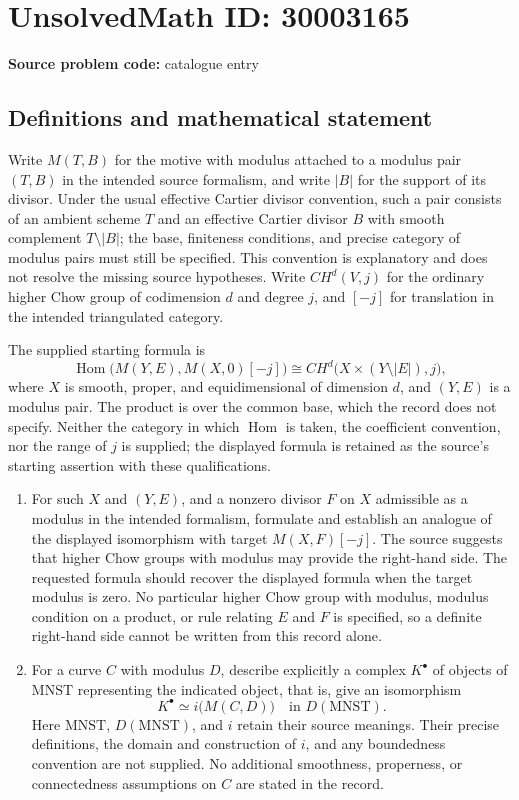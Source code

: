 \documentclass[11pt]{article}
\begin{document}
\section*{UnsolvedMath ID: 30003165}
\textbf{Source problem code:} catalogue entry
\subsection{Definitions and mathematical statement}
Write \(M(T,B)\) for the motive with modulus attached to a modulus pair \((T,B)\) in the intended source formalism, and write \(|B|\) for the support of its divisor. Under the usual effective Cartier divisor convention, such a pair consists of an ambient scheme \(T\) and an effective Cartier divisor \(B\) with smooth complement \(T\setminus |B|\); the base, finiteness conditions, and precise category of modulus pairs must still be specified. This convention is explanatory and does not resolve the missing source hypotheses. Write \(CH^d(V,j)\) for the ordinary higher Chow group of codimension \(d\) and degree \(j\), and \([-j]\) for translation in the intended triangulated category.

The supplied starting formula is
\[
\operatorname{Hom}\bigl(M(Y,E),M(X,0)[-j]\bigr)
\cong CH^d\bigl(X\times(Y\setminus |E|),j\bigr),
\]
where \(X\) is smooth, proper, and equidimensional of dimension \(d\), and \((Y,E)\) is a modulus pair. The product is over the common base, which the record does not specify. Neither the category in which \(\operatorname{Hom}\) is taken, the coefficient convention, nor the range of \(j\) is supplied; the displayed formula is retained as the source's starting assertion with these qualifications.

\begin{enumerate}
\item For such \(X\) and \((Y,E)\), and a nonzero divisor \(F\) on \(X\) admissible as a modulus in the intended formalism, formulate and establish an analogue of the displayed isomorphism with target \(M(X,F)[-j]\). The source suggests that higher Chow groups with modulus may provide the right-hand side. The requested formula should recover the displayed formula when the target modulus is zero. No particular higher Chow group with modulus, modulus condition on a product, or rule relating \(E\) and \(F\) is specified, so a definite right-hand side cannot be written from this record alone.
\item For a curve \(C\) with modulus \(D\), describe explicitly a complex \(K^\bullet\) of objects of \(\mathrm{MNST}\) representing the indicated object, that is, give an isomorphism
\[
K^\bullet\simeq i\bigl(M(C,D)\bigr)
\quad\text{in }D(\mathrm{MNST}).
\]
Here \(\mathrm{MNST}\), \(D(\mathrm{MNST})\), and \(i\) retain their source meanings. Their precise definitions, the domain and construction of \(i\), and any boundedness convention are not supplied. No additional smoothness, properness, or connectedness assumptions on \(C\) are stated in the record.
\end{enumerate}
\end{document}
